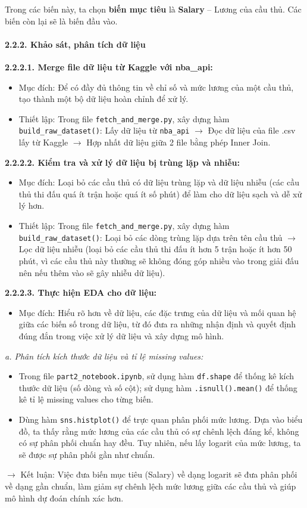 Trong các biến này, ta chọn \textbf{biến mục tiêu} là \textbf{Salary} – Lương của cầu thủ. Các biến còn lại sẽ là biến đầu vào.

\paragraph*{2.2.2. Khảo sát, phân tích dữ liệu}

\textbf{2.2.2.1. Merge file dữ liệu từ Kaggle với nba\_api:}
\begin{itemize}
    \item Mục đích: Để có đầy đủ thông tin về chỉ số và mức lương của một cầu thủ, tạo thành một bộ dữ liệu hoàn chỉnh để xử lý.
    \item Thiết lập: Trong file \texttt{fetch\_and\_merge.py}, xây dựng hàm \texttt{build\_raw\_dataset()}: Lấy dữ liệu từ \texttt{nba\_api} $\rightarrow$ Đọc dữ liệu của file .csv lấy từ Kaggle $\rightarrow$ Hợp nhất dữ liệu giữa 2 file bằng phép Inner Join.
\end{itemize}

\textbf{2.2.2.2. Kiểm tra và xử lý dữ liệu bị trùng lặp và nhiễu:}
\begin{itemize}
    \item Mục đích: Loại bỏ các cầu thủ có dữ liệu trùng lặp và dữ liệu nhiễu (các cầu thủ thi đấu quá ít trận hoặc quá ít số phút) để làm cho dữ liệu sạch và dễ xử lý hơn.
    \item Thiết lập: Trong file \texttt{fetch\_and\_merge.py}, xây dựng hàm \texttt{build\_raw\_dataset()}: Loại bỏ các dòng trùng lặp dựa trên tên cầu thủ $\rightarrow$ Lọc dữ liệu nhiễu (loại bỏ các cầu thủ thi đấu ít hơn 5 trận hoặc ít hơn 50 phút, vì các cầu thủ này thường sẽ không đóng góp nhiều vào trong giải đấu nên nếu thêm vào sẽ gây nhiễu dữ liệu).
\end{itemize}

\textbf{2.2.2.3. Thực hiện EDA cho dữ liệu:}
\begin{itemize}
    \item Mục đích: Hiểu rõ hơn về dữ liệu, các đặc trưng của dữ liệu và mối quan hệ giữa các biến số trong dữ liệu, từ đó đưa ra những nhận định và quyết định đúng đắn trong việc xử lý dữ liệu và xây dựng mô hình.
\end{itemize}

\textit{a. Phân tích kích thước dữ liệu và tỉ lệ missing values:}
\begin{itemize}
    \item Trong file \texttt{part2\_notebook.ipynb}, sử dụng hàm \texttt{df.shape} để thống kê kích thước dữ liệu (số dòng và số cột); sử dụng hàm \texttt{.isnull().mean()} để thống kê tỉ lệ missing values cho từng biến.
    \item Dùng hàm \texttt{sns.histplot()} để trực quan phân phối mức lương. Dựa vào biểu đồ, ta thấy rằng mức lương của các cầu thủ có sự chênh lệch đáng kể, không có sự phân phối chuẩn hay đều. Tuy nhiên, nếu lấy logarit của mức lương, ta sẽ được sự phân phối gần như chuẩn.
\end{itemize}
$\rightarrow$ Kết luận: Việc đưa biến mục tiêu (Salary) về dạng logarit sẽ đưa phân phối về dạng gần chuẩn, làm giảm sự chênh lệch mức lương giữa các cầu thủ và giúp mô hình dự đoán chính xác hơn.

